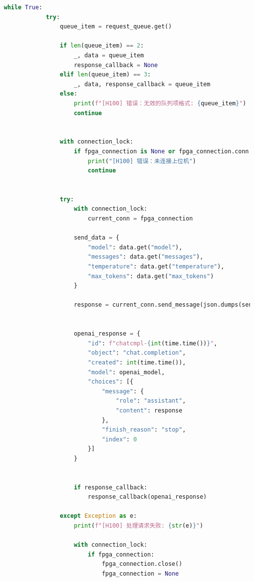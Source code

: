 \documentclass[AutoFakeBold,AutoFakeSlant,language=chinese,degree=bachelor]{sustechthesis}
\begin{document}
\begin{itemize}
\begin{lstlisting}[language=python]
        while True:
            try:
                queue_item = request_queue.get()
    
                if len(queue_item) == 2:
                    _, data = queue_item
                    response_callback = None  
                elif len(queue_item) == 3:
                    _, data, response_callback = queue_item
                else:
                    print(f"[H100] 错误：无效的队列项格式: {queue_item}")
                    continue
                
                
                with connection_lock:
                    if fpga_connection is None or fpga_connection.conn is None:
                        print("[H100] 错误：未连接上位机")
                        continue
                        
                
                try:
                    with connection_lock:
                        current_conn = fpga_connection
    
                    send_data = {
                        "model": data.get("model"),
                        "messages": data.get("messages"),
                        "temperature": data.get("temperature"),
                        "max_tokens": data.get("max_tokens")
                    }
                    
                    response = current_conn.send_message(json.dumps(send_data))
                    
                    
                    openai_response = {
                        "id": f"chatcmpl-{int(time.time())}",
                        "object": "chat.completion",
                        "created": int(time.time()),
                        "model": openai_model,
                        "choices": [{
                            "message": {
                                "role": "assistant",
                                "content": response
                            },
                            "finish_reason": "stop",
                            "index": 0
                        }]
                    }
                    
                    
                    if response_callback:
                        response_callback(openai_response)
                        
                except Exception as e:
                    print(f"[H100] 处理请求失败: {str(e)}")
                    
                    with connection_lock:
                        if fpga_connection:
                            fpga_connection.close()
                            fpga_connection = None
                    

\end{lstlisting}
\end{itemize}
\end{document}
